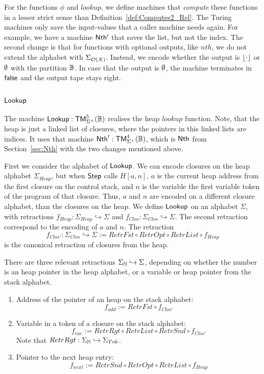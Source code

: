 For the functions $\phi$ and $lookup$, we define machines that \textit{compute} these functions in a lesser strict sense than
Definition~\ref{def:Computes2_Rel}.  The Turing machines only save the input-values that a caller machine needs again.  For example, we have a machine
$\mathsf{Nth'}$ that saves the list, but not the index.  The second change is that for functions with optional outputs, like $nth$, we do not extend the
alphabet with $\Sigma_{\mathcal{O}(X)}$.  Instead, we encode whether the output is $\left\lfloor {\cdot} \right\rfloor$ or $\emptyset$ with the partition $\mathbb{B}$.  In case that the
output is $\emptyset$, the machine terminates in $\mathsf{false}$ and the output tape stays right.


\subsection{$\mathsf{Lookup}$}
\label{sec:Lookup}

The machine $\mathsf{Lookup} : \mathsf{TM}_{\Sigma^+}^5(\mathbb{B})$ realises the heap $lookup$ function.  Note, that the heap is just a linked list of closures, where
the pointers in this linked lists are indices.  It uses that machine $\mathsf{Nth}' : \mathsf{TM}_{\Sigma^+}^4(\mathbb{B})$, which is $\mathsf{Nth}$ from
Section~\ref{sec:Nth} with the two changes mentioned above.

First we consider the alphabet of $\mathsf{Lookup}$.  We can encode closures on the heap alphabet $\Sigma_{Heap}$, but when $\mathsf{Step}$ calls $H[a,n]$,
$a$ is the current heap address from the first closure on the control stack, and $n$ is the variable the first variable token of the program of that
closure.  Thus, $a$ and $n$ are encoded on a different closure alphabet, than the closures on the heap.  We define $\mathsf{Lookup}$ on an alphabet
$\Sigma$, with retractions $f_{Heap} : \Sigma_{Heap} \hookrightarrow \Sigma$ and $f_{Clos} : \Sigma_{Clos} \hookrightarrow \Sigma$.  The second
retraction correspond to the encoding of $a$ and $n$.  The retraction
\[ f_{Clos'} : \Sigma_{Clos} \hookrightarrow \Sigma := RetrFst \circ RetrOpt \circ RetrList \circ f_{Heap} \]%
is the canonical retraction of closures from the heap.

There are three relevant retractions $\Sigma_{\mathbb{N}} \hookrightarrow \Sigma$, depending on whether the number is an heap pointer in the heap alphabet,
or a variable or heap pointer from the stack alphabet.
\begin{enumerate}
\item Address of the pointer of an heap on the stack alphabet:
  \[
    f_{add} := RetrFst \circ f_{Clos'}
  \]
\item Variable in a token of a closure on the stack alphabet:
  \[
    f_{var} := RetrRgt \circ RetrList \circ RetrSnd \circ f_{Clos'}
  \]
  Note that $RetrRgt : \Sigma_{\mathbb{N}} \hookrightarrow \Sigma_{Tok}$.
\item Pointer to the next heap entry:
  \[
    f_{next} := RetrSnd \circ RetrOpt \circ RetrList \circ f_{Heap}
  \]
\end{enumerate}

